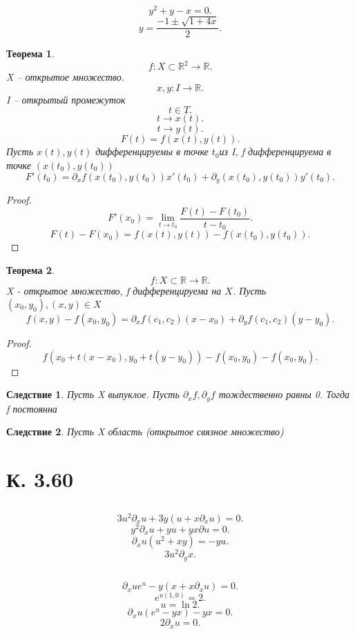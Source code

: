 \documentclass[14pt]{extarticle} \usepackage{fontspec}
\newtheorem{theorem}{Теорема}
\newtheorem{corollary}{Следствие}[theorem]
\begin{document}
\section{}
\[
    y^2 + y - x = 0
.\] 
\[
y = \frac{-1 \pm \sqrt{1 + 4x} }{2}
.\] 
\begin{theorem}
    \[
    f : X \subset \mathbb{R}^2 \to \mathbb{R}
    .\] 
    X -- открытое множество.
    \[
    x,y: I \to \mathbb{R}
    .\] 
    I -- открытый промежуток
    \[
    t \in T
    .\] 
    \[
    t \to x(t)
    .\] 
    \[
    t \to y(t)
    .\] 
    \[
    F(t) = f(x(t),y(t))
    .\] 
    Пусть $x(t),y(t)$ дифференцируемы в точке $t_0$из I, f дифференцируема  в точке $(x(t_0),y(t_0))$
    \[
    F'(t_0) = \partial_{x}f (x(t_0),y(t_0)) x'(t_0) + \partial_{y} (x(t_0),y(t_0)) y'(t_0)
    .\] 
\end{theorem}
\begin{proof}
    \[
    F'(x_0) = \lim_{t \to t_0}  \frac{F(t) -F(t_0)}{t - t_0}
    .\] 
    \[
    F(t) - F(x_0) = f(x(t),y(t)) - f(x(t_0),y(t_0))
    .\] 
\end{proof}
\begin{theorem}
    \[
    f : X \subset \mathbb{R} \to \mathbb{R}
    .\] 
    X - открытое множество, f дифференцируема на $X$. Пусть  $(x_0,y_0), (x,y) \in X$ 
    \[
    f(x,y) - f(x_0,y_0) = \partial_{x} f(c_1,c_2) (x - x_0) + \partial_{y} f(c_1,c_2)(y - y_0)
    .\] 
\end{theorem}
\begin{proof}
    \[
    f(x_0 + t(x - x_0),y_0 + t(y-y_0)) - f(x_0,y_0) - f(x_0,y_0)
    .\] 
\end{proof}
\begin{corollary}
    Пусть X выпуклое. Пусть $\partial_{x} f, \partial_{y}f$ тождественно равны 0. Тогда f постоянна
\end{corollary}
\begin{corollary}
    Пусть X область (открытое связное множество)
\end{corollary}
\section{К. 3.60}
\subsection{}
\[
3u^2 \partial_{x} u + 3y(u + x \partial_{x} u) = 0
.\] 
\[
y^2 \partial_{x} u + yu + yx \partial u = 0
.\] 
\[
\partial_{x} u (u^2 + xy) = - yu
.\] 
\[
3 u^2 \partial_{y} x
.\] 
\subsection{}
\[
\partial_{x} u  e^{u} - y(x + x \partial_{x} u) = 0
.\] 
\[
e^{u(1,0)} = 2
.\] 
\[
    u = \ln{2}
.\] 
\[
\partial_{x} u (e^{u}  - yx) - yx  = 0
.\] 
\[
2 \partial_{x} u = 0
.\] 
\end{document}
